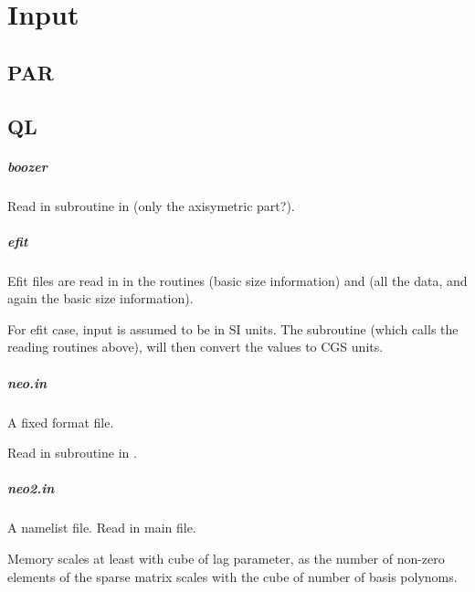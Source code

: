 \chapter{Input\label{ch:input}}


\section{PAR}


\section{QL}

\paragraph{boozer}
Read in subroutine  in  (only
the axisymetric part?).

\paragraph{efit}
Efit files are read in  in the routines
 (basic size information) and
 (all the data, and again the basic size
information).

For efit case, input is assumed to be in SI units. The subroutine
 (which calls the reading routines above), will
then convert the values to CGS units.

\paragraph{neo.in}
A fixed format file.

Read in subroutine  in
.

\paragraph{neo2.in}
A namelist file.
Read in main file.

Memory scales at least with cube of lag parameter, as the number of
non-zero elements of the sparse matrix scales with the cube of number of
basis polynoms.

